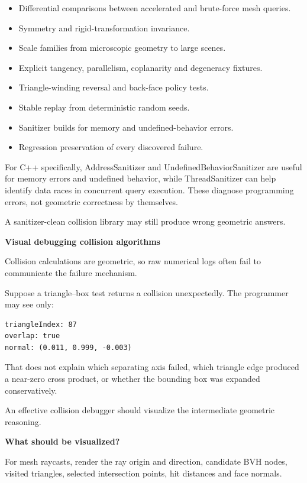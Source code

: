 \begin{itemize}
\tightlist
\item
  Differential comparisons between accelerated and brute-force mesh queries.
\item
  Symmetry and rigid-transformation invariance.
\item
  Scale families from microscopic geometry to large scenes.
\item
  Explicit tangency, parallelism, coplanarity and degeneracy fixtures.
\item
  Triangle-winding reversal and back-face policy tests.
\item
  Stable replay from deterministic random seeds.
\item
  Sanitizer builds for memory and undefined-behavior errors.
\item
  Regression preservation of every discovered failure.
\end{itemize}

For C++ specifically, AddressSanitizer and UndefinedBehaviorSanitizer are useful for memory errors and undefined behavior, while ThreadSanitizer can help identify data races in concurrent query execution. These diagnose programming errors, not geometric correctness by themselves.

A sanitizer-clean collision library may still produce wrong geometric answers.

\textbf{Visual debugging collision algorithms}

Collision calculations are geometric, so raw numerical logs often fail to communicate the failure mechanism.

Suppose a triangle--box test returns a collision unexpectedly. The programmer may see only:

\begin{verbatim}
triangleIndex: 87
overlap: true
normal: (0.011, 0.999, -0.003)
\end{verbatim}

That does not explain which separating axis failed, which triangle edge produced a near-zero cross product, or whether the bounding box was expanded conservatively.

An effective collision debugger should visualize the intermediate geometric reasoning.

\textbf{What should be visualized?}

For mesh raycasts, render the ray origin and direction, candidate BVH nodes, visited triangles, selected intersection points, hit distances and face normals.

